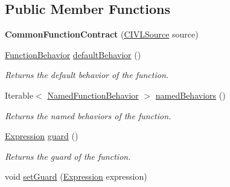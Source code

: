 \subsection*{Public Member Functions}
\begin{DoxyCompactItemize}
\item 
\hypertarget{classedu_1_1udel_1_1cis_1_1vsl_1_1civl_1_1model_1_1common_1_1contract_1_1CommonFunctionContract_afd4c1ce9fe409d3b25783eb26fb6149f}{}{\bfseries Common\+Function\+Contract} (\hyperlink{interfaceedu_1_1udel_1_1cis_1_1vsl_1_1civl_1_1model_1_1IF_1_1CIVLSource}{C\+I\+V\+L\+Source} source)\label{classedu_1_1udel_1_1cis_1_1vsl_1_1civl_1_1model_1_1common_1_1contract_1_1CommonFunctionContract_afd4c1ce9fe409d3b25783eb26fb6149f}

\item 
\hyperlink{interfaceedu_1_1udel_1_1cis_1_1vsl_1_1civl_1_1model_1_1IF_1_1contract_1_1FunctionBehavior}{Function\+Behavior} \hyperlink{classedu_1_1udel_1_1cis_1_1vsl_1_1civl_1_1model_1_1common_1_1contract_1_1CommonFunctionContract_a91520d40767c5f1c0b72f462b5d593b9}{default\+Behavior} ()
\begin{DoxyCompactList}\small\item\em Returns the default behavior of the function. \end{DoxyCompactList}\item 
Iterable$<$ \hyperlink{interfaceedu_1_1udel_1_1cis_1_1vsl_1_1civl_1_1model_1_1IF_1_1contract_1_1NamedFunctionBehavior}{Named\+Function\+Behavior} $>$ \hyperlink{classedu_1_1udel_1_1cis_1_1vsl_1_1civl_1_1model_1_1common_1_1contract_1_1CommonFunctionContract_ad368ea638dcb7528b69433e44a4daf6e}{named\+Behaviors} ()
\begin{DoxyCompactList}\small\item\em Returns the named behaviors of the function. \end{DoxyCompactList}\item 
\hyperlink{interfaceedu_1_1udel_1_1cis_1_1vsl_1_1civl_1_1model_1_1IF_1_1expression_1_1Expression}{Expression} \hyperlink{classedu_1_1udel_1_1cis_1_1vsl_1_1civl_1_1model_1_1common_1_1contract_1_1CommonFunctionContract_a511f5e7e144ed2df048eae63707ce1c0}{guard} ()
\begin{DoxyCompactList}\small\item\em Returns the guard of the function. \end{DoxyCompactList}\item 
void \hyperlink{classedu_1_1udel_1_1cis_1_1vsl_1_1civl_1_1model_1_1common_1_1contract_1_1CommonFunctionContract_a35f5f77f55a47a1aa28eb3192b92e0dd}{set\+Guard} (\hyperlink{interfaceedu_1_1udel_1_1cis_1_1vsl_1_1civl_1_1model_1_1IF_1_1expression_1_1Expression}{Expression} expression)

\end{DoxyCompactItemize}
